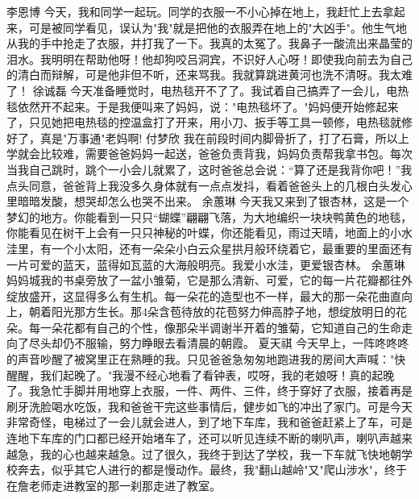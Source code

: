 {}\markdownRendererInterblockSeparator
{}李恩博\markdownRendererInterblockSeparator
{}今天，我和同学一起玩。同学的衣服一不小心掉在地上，我赶忙上去拿起来，可是被同学看见，误认为"我"就是把他的衣服弄在地上的"大凶手"。他生气地从我的手中抢走了衣服，并打我了一下。我真的太冤了。我鼻子一酸流出来晶莹的泪水。我明明在帮助他呀！他却狗咬吕洞宾，不识好人心呀！即使我向前去为自己的清白而辩解，可是他非但不听，还来骂我。我就算跳进黄河也洗不清呀。我太难了！\markdownRendererInterblockSeparator
{}\markdownRendererInterblockSeparator
{}徐诚磊\markdownRendererInterblockSeparator
{}今天准备睡觉时，电热毯开不了了。我试着自己搞弄了一会儿，电热毯依然开不起来。于是我便叫来了妈妈，说："电热毯坏了。"妈妈便开始修起来了，只见她把电热毯的控温盒打了开来，用小刀、扳手等工具一顿修，电热毯就修好了，真是"万事通"老妈啊!\markdownRendererInterblockSeparator
{}\markdownRendererInterblockSeparator
{}付梦欣\markdownRendererInterblockSeparator
{}我在前段时间内脚骨折了，打了石膏，所以上学就会比较难，需要爸爸妈妈一起送，爸爸负责背我，妈妈负责帮我拿书包。每次当我自己跳时，跳个一小会儿就累了，这时爸爸总会说：“算了还是我背你吧！”我点头同意，爸爸背上我没多久身体就有一点点发抖，看着爸爸头上的几根白头发心里暗暗发酸，想哭却怎么也哭不出来。\markdownRendererInterblockSeparator
{}\markdownRendererInterblockSeparator
{}余蕙琳\markdownRendererInterblockSeparator
{}今天我又来到了银杏林，这是一个梦幻的地方。你能看到一只只“蝴蝶”翩翩飞落，为大地编织一块块鸭黄色的地毯，你能看见在树干上会有一只只神秘的叶蝶，你还能看见，雨过天晴，地面上的小水洼里，有一个小太阳，还有一朵朵小白云众星拱月般环绕着它，最重要的里面还有一片可爱的蓝天，蓝得如瓦蓝的大海般明亮。我爱小水洼，更爱银杏林。\markdownRendererInterblockSeparator
{}\markdownRendererInterblockSeparator
{}余蕙琳\markdownRendererInterblockSeparator
{}妈妈城我的书桌旁放了一盆小雏菊，它是那么清新、可爱，它的每一片花瓣都往外绽放盛开，这显得多么有生机。每一朵花的造型也不一样，最大的那一朵花曲直向上，朝着阳光那方生长。那4朵含苞待放的花苞努力伸高脖子地，想绽放明日的花朵。每一朵花都有自己的个性，像那朵半调谢半开着的雏菊，它知道自己的生命走向了尽头却仍不服输，努力睁眼去看清晨的朝霞。\markdownRendererInterblockSeparator
{}\markdownRendererInterblockSeparator
{}夏天祺\markdownRendererInterblockSeparator
{}今天早上，一阵咚咚咚的声音吵醒了被窝里正在熟睡的我。只见爸爸急匆匆地跑进我的房间大声喊："快醒醒，我们起晚了。"我漫不经心地看了看钟表，哎呀，我的老娘呀！真的起晚了。我急忙手脚并用地穿上衣服，一件、两件、三件，终于穿好了衣服，接着再是刷牙洗脸喝水吃饭，我和爸爸干完这些事情后，健步如飞的冲出了家门。可是今天非常奇怪，电梯过了一会儿就会进人，到了地下车库，我和爸爸赶紧上了车，可是连地下车库的门口都已经开始堵车了，还可以听见连续不断的喇叭声，喇叭声越来越急，我的心也越来越急。过了很久，我终于到达了学校，我一下车就飞快地朝学校奔去，似乎其它人进行的都是慢动作。最终，我"翻山越岭"又"爬山涉水"，终于在詹老师走进教室的那一刹那走进了教室。\markdownRendererInterblockSeparator
